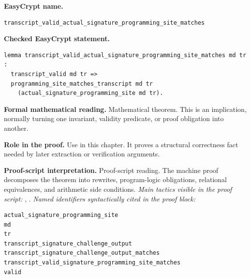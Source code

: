 \begin{formaltheorem}
\noindent\textbf{EasyCrypt name.}
\begin{lstlisting}[language=EasyCrypt,basicstyle=\ttfamily\scriptsize]
transcript_valid_actual_signature_programming_site_matches
\end{lstlisting}
\noindent\textbf{Checked EasyCrypt statement.}
\begin{lstlisting}[language=EasyCrypt,basicstyle=\ttfamily\scriptsize]
lemma transcript_valid_actual_signature_programming_site_matches md tr :
  transcript_valid md tr =>
  programming_site_matches_transcript md tr
    (actual_signature_programming_site md tr).
\end{lstlisting}
\noindent\textbf{Formal mathematical reading.}
Mathematical theorem. This is an implication, normally turning one invariant, validity predicate, or proof obligation into another.

\noindent\textbf{Role in the proof.}
Use in this chapter. It proves a structural correctness fact needed by later extraction or verification arguments.

\noindent\textbf{Proof-script interpretation.}
Proof-script reading. The machine proof decomposes the theorem into rewrites, program-logic obligations, relational equivalences, and arithmetic side conditions.
\emph{Main tactics visible in the proof script:} , .
\emph{Named identifiers syntactically cited in the proof block:}
\begin{lstlisting}[language=EasyCrypt,basicstyle=\ttfamily\scriptsize]
actual_signature_programming_site
md
tr
transcript_signature_challenge_output
transcript_signature_challenge_output_matches
transcript_valid_signature_programming_site_matches
valid
\end{lstlisting}

\end{formaltheorem}

